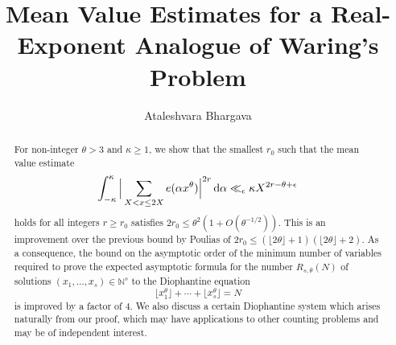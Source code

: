 \documentclass[11pt,reqno]{amsart}
\title[Mean Value Estimates]{Mean Value Estimates for a Real-Exponent Analogue of Waring's Problem}
\author{Ataleshvara Bhargava}
\numberwithin{equation}{section}
\renewcommand{\d}{\,{\rm d}}
\begin{document}
\begin{abstract} For non-integer $\theta > 3$ and $\kappa \geq 1$, we show that the smallest $r_0$ such that the mean value estimate 
\[ \int_{-\kappa}^{\kappa} \Big| \sum_{X < x \leq 2X} e(\alpha x^{\theta}) \Big|^{2r} \d\alpha \ll_{\epsilon} \kappa X^{2r - \theta+\epsilon}  \]
holds for all integers $r \geq r_0$ satisfies $2r_0 \leq \theta^2(1+O(\theta^{-1/2}))$. This is an improvement over the previous bound by Poulias \cite{Poulias1} of $2r_0 \leq (\lfloor 2\theta \rfloor + 1)(\lfloor 2\theta \rfloor + 2)$. As a consequence, the bound on the asymptotic order of the minimum number of variables required to prove the expected asymptotic formula for the number $R_{s,\theta}(N)$ of solutions $(x_1,\ldots,x_s) \in \mathbb{N}^s$ to the Diophantine equation 
\[ \lfloor x_1^{\theta} \rfloor+\cdots+\lfloor x_s^{\theta} \rfloor = N \]
is improved by a factor of $4$. We also discuss a certain Diophantine system which arises naturally from our proof, which may have applications to other counting problems and may be of independent interest. 
\end{abstract}

\maketitle 

\everymath{\displaystyle} 
\end{document}
